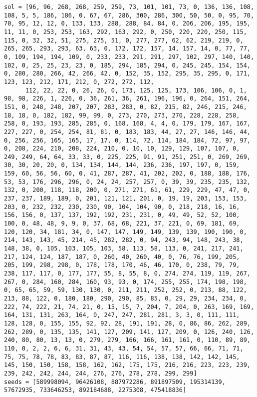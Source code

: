 \begin{lstlisting}[label={lst:call300vehicle90},caption=Optimal solution call\_300\_vehicle\_90]
sol = [96, 96, 268, 268, 259, 259, 73, 101, 101, 73, 0, 136, 136, 108, 108, 5, 5, 186, 186, 0, 67, 67, 286, 300, 286, 300, 50, 50, 0, 95, 70, 70, 95, 12, 12, 0, 133, 133, 288, 288, 84, 84, 0, 206, 206, 195, 195, 11, 11, 0, 253, 253, 163, 292, 163, 292, 0, 250, 220, 220, 250, 115, 115, 0, 32, 32, 51, 275, 275, 51, 0, 277, 277, 62, 62, 219, 219, 0, 265, 265, 293, 293, 63, 63, 0, 172, 172, 157, 14, 157, 14, 0, 77, 77, 0, 109, 194, 194, 109, 0, 233, 233, 291, 291, 297, 102, 297, 140, 140, 102, 0, 25, 25, 23, 23, 0, 185, 294, 185, 294, 0, 245, 245, 154, 154, 0, 280, 280, 266, 42, 266, 42, 0, 152, 35, 152, 295, 35, 295, 0, 171, 123, 123, 212, 171, 212, 0, 272, 272, 112,
      112, 22, 22, 0, 26, 26, 0, 173, 125, 125, 173, 106, 106, 0, 1, 98, 98, 226, 1, 226, 0, 36, 261, 36, 261, 196, 196, 0, 264, 151, 264, 151, 0, 248, 248, 207, 207, 283, 283, 0, 82, 215, 82, 246, 215, 246, 18, 18, 0, 182, 182, 99, 99, 0, 273, 270, 273, 270, 228, 228, 258, 258, 0, 193, 193, 285, 285, 0, 168, 168, 4, 4, 0, 179, 179, 167, 167, 227, 227, 0, 254, 254, 81, 81, 0, 183, 183, 44, 27, 27, 146, 146, 44, 0, 256, 256, 165, 165, 17, 17, 0, 114, 72, 114, 184, 184, 72, 97, 97, 0, 208, 224, 210, 208, 224, 210, 0, 10, 10, 129, 129, 107, 107, 0, 249, 249, 64, 64, 33, 33, 0, 225, 225, 91, 91, 251, 251, 0, 269, 269, 30, 30, 20, 20, 0, 134, 134, 144, 144, 236, 236, 197, 197, 0, 159, 159, 60, 56, 56, 60, 0, 41, 287, 287, 41, 202, 202, 0, 188, 188, 176, 53, 53, 176, 296, 296, 0, 24, 24, 257, 257, 0, 39, 39, 235, 235, 132, 132, 0, 200, 118, 118, 200, 0, 271, 271, 61, 61, 229, 229, 47, 47, 0, 237, 237, 189, 189, 0, 201, 121, 121, 201, 0, 19, 19, 203, 153, 153, 203, 0, 232, 232, 230, 230, 90, 104, 104, 90, 0, 218, 218, 16, 16, 156, 156, 0, 137, 137, 192, 192, 231, 231, 0, 49, 49, 52, 52, 100, 100, 0, 48, 48, 9, 9, 0, 37, 68, 68, 221, 37, 221, 0, 69, 181, 69, 120, 120, 34, 181, 34, 0, 147, 147, 149, 149, 139, 139, 190, 190, 0, 214, 143, 143, 45, 214, 45, 282, 282, 0, 94, 243, 94, 148, 243, 38, 148, 38, 0, 105, 103, 105, 103, 58, 113, 58, 113, 0, 241, 217, 241, 217, 124, 124, 187, 187, 0, 260, 40, 260, 40, 0, 76, 76, 199, 205, 205, 199, 298, 298, 0, 178, 178, 170, 46, 46, 170, 0, 238, 79, 79, 238, 117, 117, 0, 177, 177, 55, 8, 55, 8, 0, 274, 274, 119, 119, 267, 267, 0, 284, 160, 284, 160, 93, 93, 0, 174, 255, 255, 174, 198, 198, 0, 65, 65, 59, 59, 130, 130, 0, 211, 211, 252, 252, 0, 213, 88, 122, 213, 88, 122, 0, 180, 180, 290, 290, 85, 85, 0, 29, 29, 234, 234, 0, 222, 74, 222, 21, 74, 21, 0, 15, 15, 7, 204, 7, 204, 0, 263, 169, 169, 164, 131, 131, 263, 164, 0, 247, 247, 281, 281, 3, 3, 0, 111, 111, 128, 128, 0, 155, 155, 92, 92, 28, 191, 191, 28, 0, 86, 86, 262, 289, 262, 289, 0, 135, 135, 141, 127, 209, 141, 127, 209, 0, 126, 240, 126, 240, 80, 80, 13, 13, 0, 279, 279, 166, 166, 161, 161, 0, 110, 89, 89, 110, 0, 2, 2, 6, 6, 31, 31, 43, 43, 54, 54, 57, 57, 66, 66, 71, 71, 75, 75, 78, 78, 83, 83, 87, 87, 116, 116, 138, 138, 142, 142, 145, 145, 150, 150, 158, 158, 162, 162, 175, 175, 216, 216, 223, 223, 239, 239, 242, 242, 244, 244, 276, 276, 278, 278, 299, 299]
seeds = [589998094, 96426108, 887972286, 891897509, 195314139, 57672935, 733646253, 892184688, 2275308, 475418836]
\end{lstlisting}%
\clearpage


